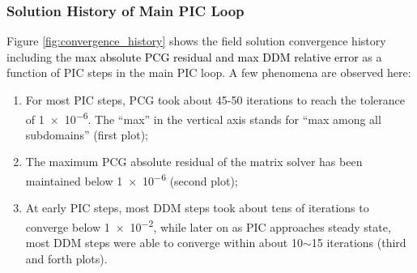\documentclass{siamart171218}
\newcommand{\coloring}[1]{\textcolor{black}{#1}} %
\begin{document}
\subsubsection{Solution History of Main PIC Loop}

Figure \ref{fig:convergence_history} shows the field solution
convergence history
including the \coloring{max absolute PCG residual and max DDM relative error}
as a function of PIC steps in the main PIC loop.
A few phenomena are observed here:
\begin{enumerate}
\item For most PIC steps, PCG took about 45-50 iterations
to reach the tolerance of \num{1e-6}.
The ``max'' in the vertical axis stands for ``max among all subdomains''
(first plot);

\item The maximum PCG absolute residual of the matrix solver has been maintained
below \num{1e-6} (second plot);

\item At early PIC steps, most DDM steps took about tens of iterations to converge
below \num{1e-2},
while later on as PIC approaches steady state,
most DDM steps were able to converge within about 10$\sim$15 iterations
(third and forth plots).

\end{enumerate}
\end{document}
